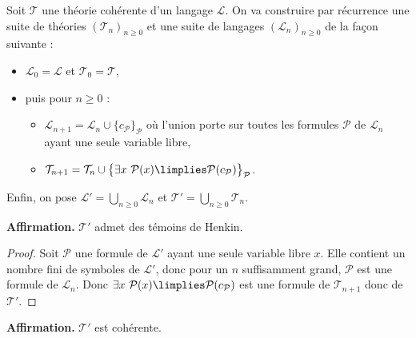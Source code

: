 \documentclass[11pt,class=report,crop=false]{standalone}
\begin{document}
Soit $\mathcal{T}$ une théorie cohérente d'un langage $\mathcal{L}$.
On va construire par récurrence une suite de théories $(\mathcal{T}_n)_{n \ge 0}$ et une suite de langages $(\mathcal{L}_n)_{n \ge 0}$ de la façon suivante :
\begin{itemize}
	\item $\mathcal{L}_0 = \mathcal{L}$ et $\mathcal{T}_0 = \mathcal{T}$,
	\item puis pour $n \ge 0$ :
	\begin{itemize}
		\item $\mathcal{L}_{n+1} = \mathcal{L}_n \cup \big\{c_{\mathcal{P}}\big\}_{\mathcal{P}}$ où l'union porte sur toutes les formules $\mathcal{P}$ de $\mathcal{L}_n$ ayant une seule variable libre,
		\item $\mathcal{T}_{n+1} = \mathcal{T}_n \cup \big\{\exists x\ \mathcal{P}(x) \limplies \mathcal{P}(c_{\mathcal{P}})\big\}_{\mathcal{P}}$.
	\end{itemize}
\end{itemize}
Enfin, on pose $\mathcal{L}' = \bigcup_{n \ge 0} \mathcal{L}_n$ et $\mathcal{T}' = \bigcup_{n \ge 0} \mathcal{T}_n$.

\medskip

\textbf{Affirmation.} $\mathcal{T}'$ admet des témoins de Henkin.

\begin{proof}
	Soit $\mathcal{P}$ une formule de $\mathcal{L}'$ ayant une seule variable libre $x$. Elle contient un nombre fini de symboles de $\mathcal{L}'$, donc pour un $n$ suffisamment grand, $\mathcal{P}$ est une formule de $\mathcal{L}_n$. Donc $\exists x\ \mathcal{P}(x) \limplies \mathcal{P}(c_{\mathcal{P}})$ est une formule de $\mathcal{T}_{n+1}$ donc de $\mathcal{T}'$.
\end{proof}

\medskip

\textbf{Affirmation.} $\mathcal{T}'$ est cohérente.
\end{document}
